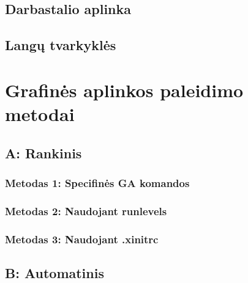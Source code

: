     \subsection{Darbastalio aplinka}

    \subsection{Langų tvarkyklės}

  \section{Grafinės aplinkos paleidimo metodai}

    \subsection{A: Rankinis}

      \subsubsection{Metodas 1: Specifinės GA komandos}

      \subsubsection{Metodas 2: Naudojant runlevels}

      \subsubsection{Metodas 3: Naudojant .xinitrc}

    \subsection{B: Automatinis}
